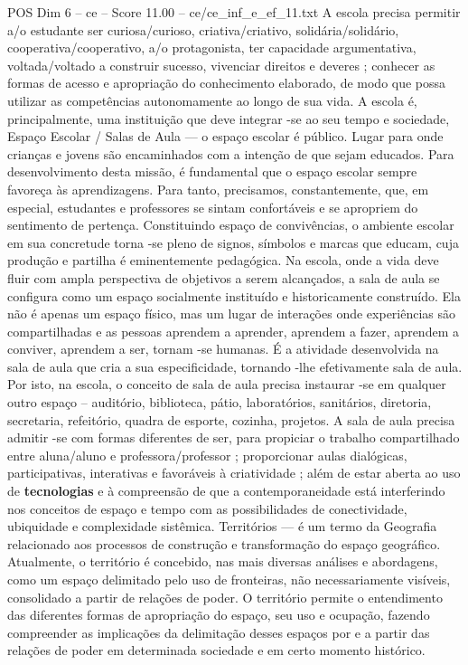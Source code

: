 \begin{textsample}{POS Dim 6 – ce – Score 11.00 – ce/ce\_inf\_e\_ef\_11.txt}
A escola precisa permitir a/o estudante ser curiosa/curioso, criativa/criativo, solidária/solidário, cooperativa/cooperativo, a/o protagonista, ter capacidade argumentativa, voltada/voltado a construir sucesso, vivenciar direitos e deveres ; conhecer as formas de acesso e apropriação do conhecimento elaborado, de modo que possa utilizar as competências autonomamente ao longo de sua vida.
A escola é, principalmente, uma instituição que deve integrar -se ao seu tempo e sociedade, Espaço Escolar / Salas de Aula — o espaço escolar é público.
Lugar para onde crianças e jovens são encaminhados com a intenção de que sejam educados.
Para desenvolvimento desta missão, é fundamental que o espaço escolar sempre favoreça às aprendizagens.
Para tanto, precisamos, constantemente, que, em especial, estudantes e professores se sintam confortáveis e se apropriem do sentimento de pertença.
Constituindo espaço de convivências, o ambiente escolar em sua concretude torna -se pleno de signos, símbolos e marcas que educam, cuja produção e partilha é eminentemente pedagógica.
Na escola, onde a vida deve fluir com ampla perspectiva de objetivos a serem alcançados, a sala de aula se configura como um espaço socialmente instituído e historicamente construído.
Ela não é apenas um espaço físico, mas um lugar de interações onde experiências são compartilhadas e as pessoas aprendem a aprender, aprendem a fazer, aprendem a conviver, aprendem a ser, tornam -se humanas.
É a atividade desenvolvida na sala de aula que cria a sua especificidade, tornando -lhe efetivamente sala de aula.
Por isto, na escola, o conceito de sala de aula precisa instaurar -se em qualquer outro espaço – auditório, biblioteca, pátio, laboratórios, sanitários, diretoria, secretaria, refeitório, quadra de esporte, cozinha, projetos.
A sala de aula precisa admitir -se com formas diferentes de ser, para propiciar o trabalho compartilhado entre aluna/aluno e professora/professor ; proporcionar aulas dialógicas, participativas, interativas e favoráveis à criatividade ; além de estar aberta ao uso de \textbf{tecnologias} e à compreensão de que a contemporaneidade está interferindo nos conceitos de espaço e tempo com as possibilidades de conectividade, ubiquidade e complexidade sistêmica.
Territórios — é um termo da Geografia relacionado aos processos de construção e transformação do espaço geográfico.
Atualmente, o território é concebido, nas mais diversas análises e abordagens, como um espaço delimitado pelo uso de fronteiras, não necessariamente visíveis, consolidado a partir de relações de poder.
O território permite o entendimento das diferentes formas de apropriação do espaço, seu uso e ocupação, fazendo compreender as implicações da delimitação desses espaços por e a partir das relações de poder em determinada sociedade e em certo momento histórico.

\end{textsample}
